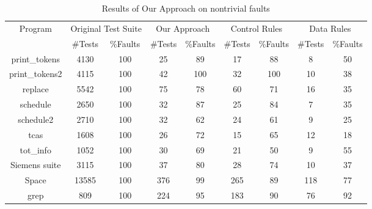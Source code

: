 \documentclass{sig-alternate}
\begin{document}
\begin{table}[htbp]
\caption{Results of Our Approach on nontrivial
faults}\label{tab:our:nontrivial} \center
\begin{tabular}{|c|c|c|c|c|c|c|c|c|}

\hline Program   & \multicolumn{2}{c}{Original Test Suite} \vline &
\multicolumn{2}{c}{Our Approach} \vline
& \multicolumn{2}{c}{Control Rules} \vline & \multicolumn{2}{c}{Data Rules} \vline   \\

\cline{2-9}  & \#Tests &   \%Faults & \#Tests &   \%Faults &
\#Tests &   \%Faults & \#Tests &   \%Faults \\
\hline  print\_tokens   &   4130    &   100 &   25  &   89  &   17  &   88  &   8   &   50  \\
\hline  print\_tokens2  &   4115    &   100 &   42  &   100 &   32  &   100 &   10  &   38  \\
\hline  replace &   5542    &   100 &   75  &   78  &   60  &   71  &   16  &   35  \\
\hline  schedule    &   2650    &   100 &   32  &   87  &   25  &   84  &   7   &   35  \\
\hline  schedule2   &   2710    &   100 &   32  &   62  &   24  &   61  &   9   &   25  \\
\hline  tcas    &   1608    &   100 &   26  &   72  &   15  &   65  &   12  &   18  \\
\hline  tot\_info &   1052    &   100 &   30  &   69  &   21  &   50  &   9   &   55  \\
\hline  Siemens suite   &   3115    &   100 &   37  &   80  &   28  &   74  &   10  &   37  \\
\hline  Space   &   13585   &   100 &   376 &   99  &   265 &   89  &   118 &   77  \\
\hline  grep    &   809 &   100 &   224 &   95  &   183 &   90  &   76  &   92  \\

\hline
\end{tabular}
\end{table}
\end{document}
